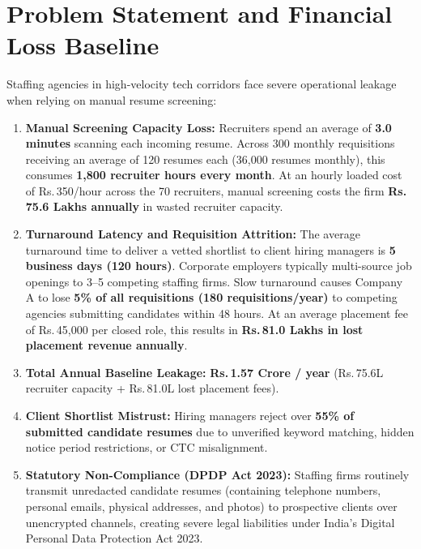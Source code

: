 \documentclass[11pt,a4paper,oneside]{report}
\newcommand{\INR}{\textsf{Rs.\,}}
\begin{document}
\section{Problem Statement and Financial Loss Baseline}
Staffing agencies in high-velocity tech corridors face severe operational leakage when relying on manual resume screening:
\begin{enumerate}[leftmargin=1.5em]
    \item \textbf{Manual Screening Capacity Loss:} Recruiters spend an average of \textbf{3.0 minutes} scanning each incoming resume. Across 300 monthly requisitions receiving an average of 120 resumes each (36,000 resumes monthly), this consumes \textbf{1,800 recruiter hours every month}. At an hourly loaded cost of \INR 350/hour across the 70 recruiters, manual screening costs the firm \textbf{\INR 75.6 Lakhs annually} in wasted recruiter capacity.
    \item \textbf{Turnaround Latency and Requisition Attrition:} The average turnaround time to deliver a vetted shortlist to client hiring managers is \textbf{5 business days (120 hours)}. Corporate employers typically multi-source job openings to 3--5 competing staffing firms. Slow turnaround causes Company A to lose \textbf{5\% of all requisitions (180 requisitions/year)} to competing agencies submitting candidates within 48 hours. At an average placement fee of \INR 45,000 per closed role, this results in \textbf{\INR 81.0 Lakhs in lost placement revenue annually}.
    \item \textbf{Total Annual Baseline Leakage:} \textbf{\INR 1.57 Crore / year} (\INR 75.6L recruiter capacity + \INR 81.0L lost placement fees).
    \item \textbf{Client Shortlist Mistrust:} Hiring managers reject over \textbf{55\% of submitted candidate resumes} due to unverified keyword matching, hidden notice period restrictions, or CTC misalignment.
    \item \textbf{Statutory Non-Compliance (DPDP Act 2023):} Staffing firms routinely transmit unredacted candidate resumes (containing telephone numbers, personal emails, physical addresses, and photos) to prospective clients over unencrypted channels, creating severe legal liabilities under India's Digital Personal Data Protection Act 2023.
\end{enumerate}
\end{document}

